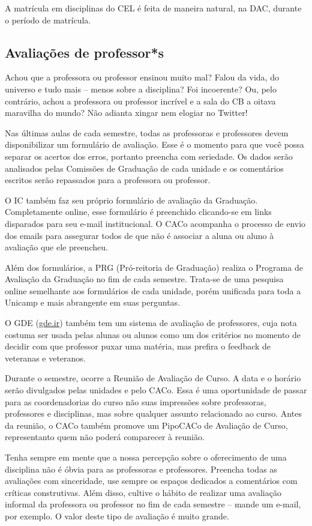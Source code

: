 A matrícula em disciplinas do CEL é feita de maneira natural, na DAC, durante o
período de matrícula.

\subsection{Avaliações de professor*s}

Achou que a professora ou professor ensinou muito mal? Falou da vida, do
universo e tudo mais -- menos sobre a disciplina? Foi incoerente? Ou, pelo
contrário, achou a professora ou professor incrível e a sala do CB a oitava
maravilha do mundo? Não adianta xingar nem elogiar no Twitter!

Nas últimas aulas de cada semestre, todas as professoras e professores devem
disponibilizar um formulário de avaliação. Esse é o momento para que você possa
separar os acertos dos erros, portanto preencha com seriedade. Os dados serão
analisados pelas Comissões de Graduação de cada unidade e os comentários
escritos serão repassados para a professora ou professor.

O IC também faz seu próprio formulário de avaliação da Graduação. Completamente
online, esse formulário é preenchido clicando-se em links disparados para seu
e-mail institucional. O CACo acompanha o processo de envio dos emails para
assegurar todos de que não é associar a aluna ou aluno à avaliação que ele
preencheu.

Além dos formulários, a PRG (Pró-reitoria de Graduação) realiza o Programa de
Avaliação da Graduação no fim de cada semestre. Trata-se de uma pesquisa
online semelhante aos formulários de cada unidade, porém unificada para toda a
Unicamp e mais abrangente em suas perguntas.

O GDE (\url{gde.ir}) também tem um sistema de avaliação de professores, cuja
nota costuma ser usada pelas alunas ou alunos como um dos critérios no momento
de decidir com que professor puxar uma matéria, mas prefira o feedback de
veteranas e veteranos.

Durante o semestre, ocorre a Reunião de Avaliação de Curso. A data e o horário
serão divulgados pelas unidades e pelo CACo. Essa é uma oportunidade de passar
para as coordenadorias do curso não suas impressões sobre professoras,
professores e disciplinas, mas sobre qualquer assunto relacionado ao curso.
Antes da reunião, o CACo também promove um PipoCACo de Avaliação de Curso,
representanto quem não poderá comparecer à reunião.

Tenha sempre em mente que a nossa percepção sobre o oferecimento de uma
disciplina não é óbvia para as professoras e professores. Preencha todas as
avaliações com sinceridade, use sempre os espaços dedicados a comentários com
críticas construtivas. Além disso, cultive o hábito de realizar uma avaliação
informal da professora ou professor no fim de cada semestre -- mande um e-mail,
por exemplo. O valor deste tipo de avaliação é muito grande.
